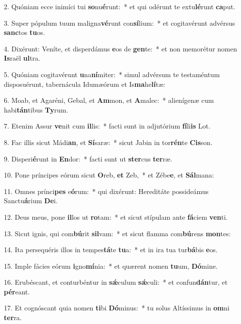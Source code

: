 2. Quóniam ecce inimíci tui \textbf{so}nu\textbf{é}runt:~*  et qui odérunt te extu\textbf{lé}runt \textbf{ca}put.\

3. Super pópulum tuum maligna\textbf{vé}runt con\textbf{sí}lium:~*  et cogitavérunt advérsus \textbf{sanc}tos \textbf{tu}os.\

4. Dixérunt: Veníte, et disperdámus \textbf{e}os de \textbf{gen}te:~*  et non memorétur nomen \textbf{Is}raël \textbf{ul}tra.\

5. Quóniam cogitavérunt \textbf{u}na\textbf{ní}miter:~*  simul advérsum te testaméntum disposuérunt, tabernácula Idumæórum et Is\textbf{ma}he\textbf{lí}tæ:\

6. Moab, et Agaréni, Gebal, et \textbf{Am}mon, et \textbf{A}malec:~*  alienígenæ cum habi\textbf{tán}tibus \textbf{Ty}rum.\

7. Etenim Assur \textbf{ve}nit cum \textbf{il}lis:~*  facti sunt in adjutórium \textbf{fí}li\textbf{is} Lot.\

8. Fac illis sicut Mádi\textbf{an}, et \textbf{Sí}saræ:~*  sicut Jabin in tor\textbf{rén}te \textbf{Cis}son.\

9. Disperi\textbf{é}runt in \textbf{En}dor:~*  facti sunt ut \textbf{ster}cus \textbf{ter}ræ.\

10. Pone príncipes eórum sicut \textbf{O}reb, \textbf{et} Zeb,~*  et Zébe\textbf{e}, et \textbf{Sál}mana:\

11. Omnes prínci\textbf{pes} e\textbf{ó}rum:~*  qui dixérunt: Hereditáte possideámus Sanctu\textbf{á}rium \textbf{De}i.\

12. Deus meus, pone \textbf{il}los ut \textbf{ro}tam:~*  et sicut stípulam ante \textbf{fá}ciem \textbf{ven}ti.\

13. Sicut ignis, qui com\textbf{bú}rit \textbf{sil}vam:~*  et sicut flamma com\textbf{bú}rens \textbf{mon}tes:\

14. Ita persequéris illos in tempes\textbf{tá}te \textbf{tu}a:~*  et in ira tua tur\textbf{bá}bis \textbf{e}os.\

15. Imple fácies eórum \textbf{i}gno\textbf{mí}nia:~*  et quærent nomen \textbf{tu}um, \textbf{Dó}mine.\

16. Erubéscant, et conturbéntur in \textbf{sǽ}culum \textbf{sǽ}culi:~*  et confun\textbf{dán}tur, et \textbf{pér}eant.\

17. Et cognóscant quia nomen \textbf{ti}bi \textbf{Dó}minus:~*  tu solus Altíssimus in \textbf{om}ni \textbf{ter}ra.\

